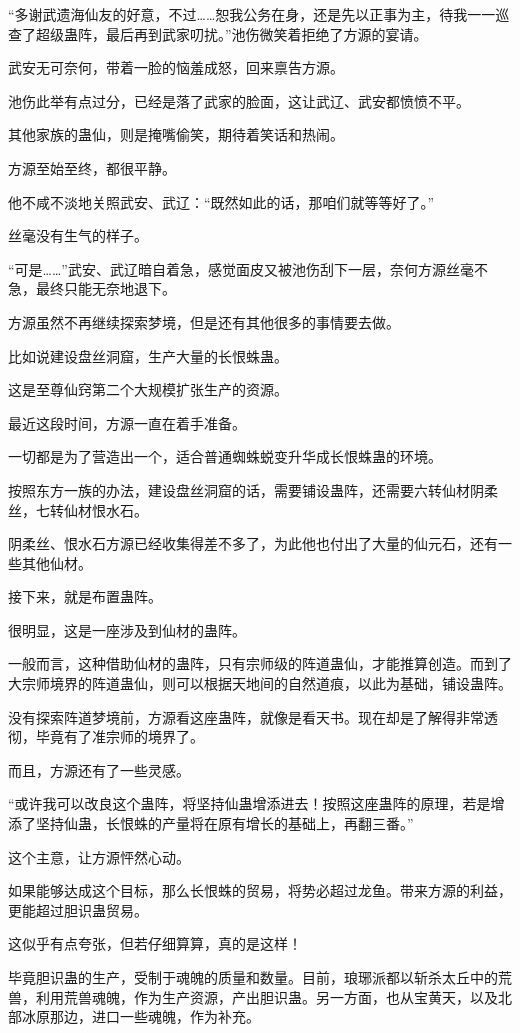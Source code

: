 \begin{this_body}
“多谢武遗海仙友的好意，不过……恕我公务在身，还是先以正事为主，待我一一巡查了超级蛊阵，最后再到武家叨扰。”池伤微笑着拒绝了方源的宴请。

武安无可奈何，带着一脸的恼羞成怒，回来禀告方源。

池伤此举有点过分，已经是落了武家的脸面，这让武辽、武安都愤愤不平。

其他家族的蛊仙，则是掩嘴偷笑，期待着笑话和热闹。

方源至始至终，都很平静。

他不咸不淡地关照武安、武辽：“既然如此的话，那咱们就等等好了。”

丝毫没有生气的样子。

“可是……”武安、武辽暗自着急，感觉面皮又被池伤刮下一层，奈何方源丝毫不急，最终只能无奈地退下。

方源虽然不再继续探索梦境，但是还有其他很多的事情要去做。

比如说建设盘丝洞窟，生产大量的长恨蛛蛊。

这是至尊仙窍第二个大规模扩张生产的资源。

最近这段时间，方源一直在着手准备。

一切都是为了营造出一个，适合普通蜘蛛蜕变升华成长恨蛛蛊的环境。

按照东方一族的办法，建设盘丝洞窟的话，需要铺设蛊阵，还需要六转仙材阴柔丝，七转仙材恨水石。

阴柔丝、恨水石方源已经收集得差不多了，为此他也付出了大量的仙元石，还有一些其他仙材。

接下来，就是布置蛊阵。

很明显，这是一座涉及到仙材的蛊阵。

一般而言，这种借助仙材的蛊阵，只有宗师级的阵道蛊仙，才能推算创造。而到了大宗师境界的阵道蛊仙，则可以根据天地间的自然道痕，以此为基础，铺设蛊阵。

没有探索阵道梦境前，方源看这座蛊阵，就像是看天书。现在却是了解得非常透彻，毕竟有了准宗师的境界了。

而且，方源还有了一些灵感。

“或许我可以改良这个蛊阵，将坚持仙蛊增添进去！按照这座蛊阵的原理，若是增添了坚持仙蛊，长恨蛛的产量将在原有增长的基础上，再翻三番。”

这个主意，让方源怦然心动。

如果能够达成这个目标，那么长恨蛛的贸易，将势必超过龙鱼。带来方源的利益，更能超过胆识蛊贸易。

这似乎有点夸张，但若仔细算算，真的是这样！

毕竟胆识蛊的生产，受制于魂魄的质量和数量。目前，琅琊派都以斩杀太丘中的荒兽，利用荒兽魂魄，作为生产资源，产出胆识蛊。另一方面，也从宝黄天，以及北部冰原那边，进口一些魂魄，作为补充。


\end{this_body}
